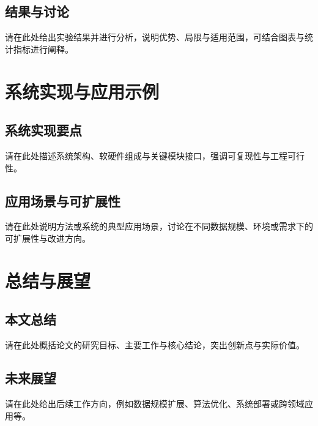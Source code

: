 \documentclass[unicode,master,submission,final]{scutthesis}
\renewcommand{\chaptermark}[1]{\markboth{\chaptername\ #1}{}}
\begin{document}
\section{结果与讨论}

请在此处给出实验结果并进行分析，说明优势、局限与适用范围，可结合图表与统计指标进行阐释。

\chapter{系统实现与应用示例}

\section{系统实现要点}

请在此处描述系统架构、软硬件组成与关键模块接口，强调可复现性与工程可行性。

\section{应用场景与可扩展性}

请在此处说明方法或系统的典型应用场景，讨论在不同数据规模、环境或需求下的可扩展性与改进方向。

\backmatter
\renewcommand{\chaptermark}[1]{\markboth{#1}{}}

\chapter{总结与展望}

\section*{本文总结}
{} %

请在此处概括论文的研究目标、主要工作与核心结论，突出创新点与实际价值。

\section*{未来展望}
{}

请在此处给出后续工作方向，例如数据规模扩展、算法优化、系统部署或跨领域应用等。
\end{document}
